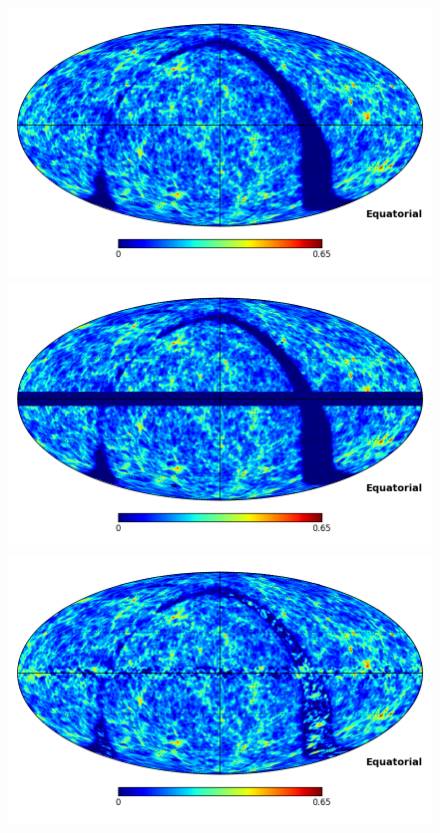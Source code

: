 \documentclass[useAMS,usenatbib]{mn2e}
\begin{document}
\begin{figure}
  \includegraphics[width=\columnwidth]{infill_test_dataC.png}
  \includegraphics[width=\columnwidth]{infill_test_maskeddataC.png}
  \includegraphics[width=\columnwidth]{infill_test_resultC.png}

\end{figure}
\end{document}
